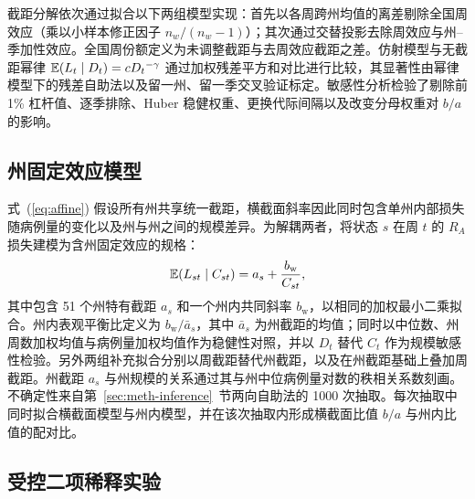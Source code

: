 截距分解依次通过拟合以下两组模型实现：首先以各周跨州均值的离差剔除全国周效应（乘以小样本修正因子 $n_w/(n_w-1)$）；其次通过交替投影去除周效应与州--季加性效应。全国周份额定义为未调整截距与去周效应截距之差。仿射模型与无截距幂律 $\mathbb{E}(L_t\mid D_t)=cD_t{}^{-\gamma}$ 通过加权残差平方和对比进行比较，其显著性由幂律模型下的残差自助法以及留一州、留一季交叉验证标定。敏感性分析检验了剔除前 1\% 杠杆值、逐季排除、Huber 稳健权重、更换代际间隔以及改变分母权重对 $b/a$ 的影响。

\subsection{州固定效应模型}
\label{sec:meth-fe}

式~(\ref{eq:affine}) 假设所有州共享统一截距，横截面斜率因此同时包含单州内部损失随病例量的变化以及州与州之间的规模差异。为解耦两者，将状态 $s$ 在周 $t$ 的 $R_A$ 损失建模为含州固定效应的规格：
\begin{equation}
  \mathbb{E}(L_{st}\mid C_{st})=a_s+\frac{b_{\mathrm{w}}}{C_{st}},
  \label{eq:fe}
\end{equation}
其中包含 51 个州特有截距 $a_s$ 和一个州内共同斜率 $b_{\mathrm{w}}$，以相同的加权最小二乘拟合。州内表观平衡比定义为 $b_{\mathrm{w}}/\bar{a}_s$，其中 $\bar{a}_s$ 为州截距的均值；同时以中位数、州周数加权均值与病例量加权均值作为稳健性对照，并以 $D_t$ 替代 $C_t$ 作为规模敏感性检验。另外两组补充拟合分别以周截距替代州截距，以及在州截距基础上叠加周截距。州截距 $a_s$ 与州规模的关系通过其与州中位病例量对数的秩相关系数刻画。不确定性来自第~\ref{sec:meth-inference}~节两向自助法的 1000 次抽取。每次抽取中同时拟合横截面模型与州内模型，并在该次抽取内形成横截面比值 $b/a$ 与州内比值的配对比。

\subsection{受控二项稀释实验}
\label{sec:meth-thinning}

